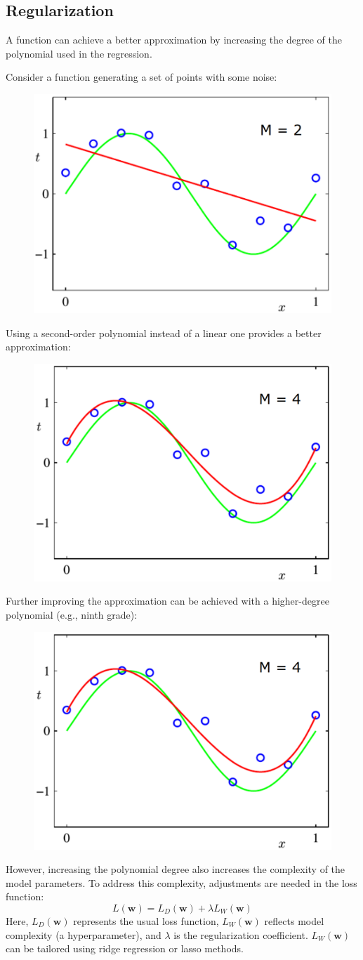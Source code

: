 \subsection{Regularization}
A function can achieve a better approximation by increasing the degree of the polynomial used in the regression.
\begin{example}
    Consider a function generating a set of points with some noise:
    \begin{figure}[H]
        \centering
        \includegraphics[width=0.25\linewidth]{images/reg.png}
    \end{figure}
    Using a second-order polynomial instead of a linear one provides a better approximation:
    \begin{figure}[H]
        \centering
        \includegraphics[width=0.25\linewidth]{images/reg1.png}
    \end{figure}
    Further improving the approximation can be achieved with a higher-degree polynomial (e.g., ninth grade):
    \begin{figure}[H]
        \centering
        \includegraphics[width=0.25\linewidth]{images/reg1.png}
    \end{figure}
\end{example}
However, increasing the polynomial degree also increases the complexity of the model parameters.
To address this complexity, adjustments are needed in the loss function:
\[L(\textbf{w})=L_D(\textbf{w})+\lambda L_W(\textbf{w})\]
Here, $L_D(\textbf{w})$ represents the usual loss function, $L_W(\textbf{w})$ reflects model complexity (a hyperparameter), and $\lambda$ is the regularization coefficient.
$L_W(\textbf{w})$ can be tailored using ridge regression or lasso methods.

